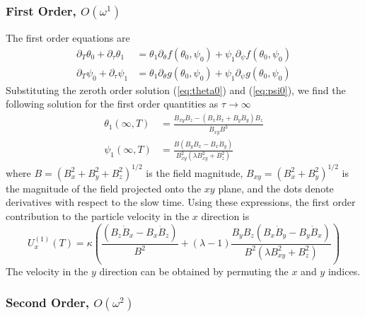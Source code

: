\begin{appendices}
\subsubsection{First Order, $O(\omega^1)$}

The first order equations are 
\begin{align}
    \partial_T \theta_0 + \partial_{\tau} \theta_1 &= \theta_1 \partial_{\theta} f(\theta_0,\psi_0) + \psi_1 \partial_{\psi} f(\theta_0,\psi_0)
    \\
    \partial_T \psi_0 + \partial_{\tau} \psi_1 &= \theta_1 \partial_{\theta} g(\theta_0,\psi_0) + \psi_1 \partial_{\psi} g(\theta_0,\psi_0)
\end{align}
Substituting the zeroth order solution (\ref{eq:theta0}) and (\ref{eq:psi0}), we find the following solution for the first order quantities as $\tau\rightarrow \infty$ 
\begin{align}
    \theta_1(\infty,T) &= \frac{B_{xy} \dot{B}_z -( B_x \dot{B}_x + B_y \dot{B}_y)B_z}{B_{xy}B^3 } \label{eq:theta1}
    \\
    \psi_1(\infty,T) & = \frac{B(B_y \dot{B}_x - B_x \dot{B}_y)}{B_{xy}^2(\lambda B_{xy}^2 + B_z^2)} \label{eq:psi1}
\end{align}
where $B=(B_x^2+B_y^2+B_z^2)^{1/2}$ is the field magnitude, $B_{xy}=(B_x^2+B_y^2)^{1/2}$ is the magnitude of the field projected onto the $xy$ plane, and the dots denote derivatives with respect to the slow time.  Using these expressions, the first order contribution to the particle velocity in the $x$ direction is 
\begin{equation}
    U_x^{(1)}(T) = \kappa  \left(\frac{(B_z \dot{B}_x - B_x \dot{B}_z)}{B^2} +  (\lambda-1)\frac{B_y B_z (B_x \dot{B}_y - B_y \dot{B}_x)}{B^2(\lambda B^2_{xy} + B_z^2)} \right) \label{eq:Ux1}
\end{equation}
The velocity in the $y$ direction can be obtained by permuting the $x$ and $y$ indices.

\subsubsection{Second Order, $O(\omega^2)$}


\end{appendices}
